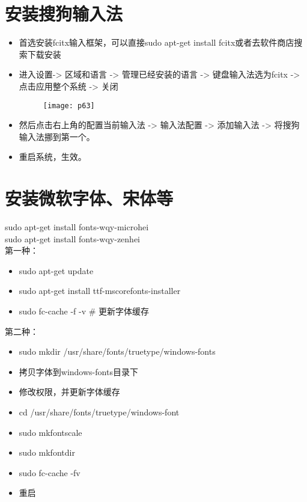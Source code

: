 \documentclass[utf8]{book}
\begin{document}
\begin{appendices}
	\section{安装搜狗输入法}\label{u1}
	\begin{itemize}
		\item 首选安装fcitx输入框架，可以直接sudo apt-get install fcitx或者去软件商店搜索下载安装
		\item 进入设置-> 区域和语言 -> 管理已经安装的语言 -> 键盘输入法选为fcitx -> 点击应用整个系统 -> 关闭
			\begin{figure}[H]
			\centering
			\texttt{[image: p63]}
			\end{figure}
		\item 然后点击右上角的配置当前输入法 -> 输入法配置 -> 添加输入法 -> 将搜狗输入法挪到第一个。
		\item 重启系统，生效。
	\end{itemize}
	
	\section{安装微软字体、宋体等}\label{u2}
	sudo apt-get install fonts-wqy-microhei\\
	sudo apt-get install fonts-wqy-zenhei\\
	
	第一种：
		\begin{itemize}
		\item sudo apt-get update
		\item sudo apt-get install ttf-mscorefonts-installer
		\item sudo fc-cache -f -v   \# 更新字体缓存

		\end{itemize}

	第二种：
		\begin{itemize}
		\item sudo mkdir /usr/share/fonts/truetype/windows-fonts
		\item 拷贝字体到windows-fonts目录下
		\item 修改权限，并更新字体缓存
		\item cd /usr/share/fonts/truetype/windows-font
		\item sudo mkfontscale
		\item sudo mkfontdir
		\item sudo fc-cache -fv
		\item 重启
		\end{itemize}


\end{appendices}
\end{document}
